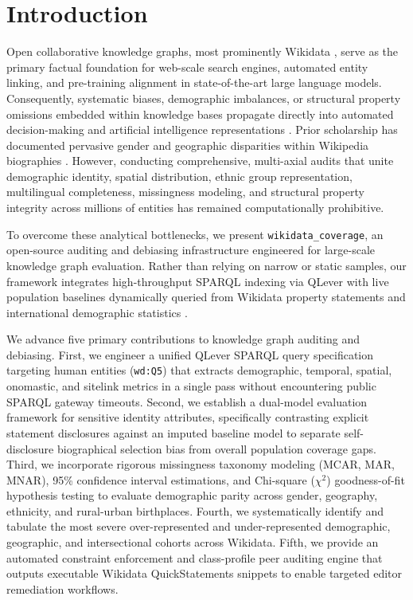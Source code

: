\documentclass[11pt,a4paper]{article}
\begin{document}
\section{Introduction}
Open collaborative knowledge graphs, most prominently Wikidata \cite{vrandecic2014wikidata}, serve as the primary factual foundation for web-scale search engines, automated entity linking, and pre-training alignment in state-of-the-art large language models. Consequently, systematic biases, demographic imbalances, or structural property omissions embedded within knowledge bases propagate directly into automated decision-making and artificial intelligence representations \cite{klein2015monitoring, beyTIA2020geographic}. Prior scholarship has documented pervasive gender and geographic disparities within Wikipedia biographies \cite{wagner2015gender, reagle2011gender}. However, conducting comprehensive, multi-axial audits that unite demographic identity, spatial distribution, ethnic group representation, multilingual completeness, missingness modeling, and structural property integrity across millions of entities has remained computationally prohibitive.

To overcome these analytical bottlenecks, we present \texttt{wikidata\_coverage}, an open-source auditing and debiasing infrastructure engineered for large-scale knowledge graph evaluation. Rather than relying on narrow or static samples, our framework integrates high-throughput SPARQL indexing via QLever \cite{bast2017qlever} with live population baselines dynamically queried from Wikidata property statements and international demographic statistics \cite{ipsos2023pride, ipsos2024pride, undesa2024prospects, ghsl2024urbanization}.

We advance five primary contributions to knowledge graph auditing and debiasing.
First, we engineer a unified QLever SPARQL query specification targeting human entities (\texttt{wd:Q5}) that extracts demographic, temporal, spatial, onomastic, and sitelink metrics in a single pass without encountering public SPARQL gateway timeouts.
Second, we establish a dual-model evaluation framework for sensitive identity attributes, specifically contrasting explicit statement disclosures against an imputed baseline model to separate self-disclosure biographical selection bias from overall population coverage gaps.
Third, we incorporate rigorous missingness taxonomy modeling (MCAR, MAR, MNAR), 95\% confidence interval estimations, and Chi-square ($\chi^2$) goodness-of-fit hypothesis testing to evaluate demographic parity across gender, geography, ethnicity, and rural-urban birthplaces.
Fourth, we systematically identify and tabulate the most severe over-represented and under-represented demographic, geographic, and intersectional cohorts across Wikidata.
Fifth, we provide an automated constraint enforcement and class-profile peer auditing engine that outputs executable Wikidata QuickStatements snippets to enable targeted editor remediation workflows.
\end{document}
